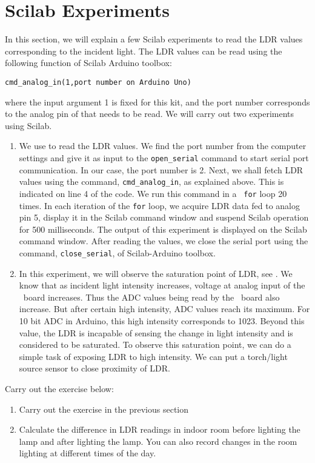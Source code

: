 \section {Scilab Experiments}
In this section, we will explain a few Scilab experiments to read the
LDR values corresponding to the incident light. The LDR values can be
read using the following function of Scilab Arduino toolbox:
\begin{lstlisting}[style=nonumbers]
  cmd_analog_in(1,port number on Arduino Uno)
\end{lstlisting}
where the input argument 1 is fixed for this kit, and the port number corresponds to the analog pin of \arduino that needs to be read.  We will carry out two experiments using Scilab.

\begin{enumerate}
\item We use  to read the LDR values.  We find the
  port number from the computer settings and give it as input to the
  {\tt open\_serial} command to start serial port communication. In
  our case, the port number is 2. Next, we shall fetch LDR values
  using the command, {\tt cmd\_analog\_in}, as explained above. This
  is indicated on line 4 of the code. We run this command in a {\tt
    for} loop 20 times. In each iteration of the {\tt for} loop, we
  acquire LDR data fed to analog pin 5, display it in the Scilab
  command window and suspend Scilab operation for 500
  milliseconds. The output of this experiment is displayed on the Scilab command
  window. After reading the values, we close the serial port using the
  command, {\tt close\_serial}, of Scilab-Arduino toolbox.

\item In this experiment, we will observe the saturation point of LDR,
  see .  We know that as incident light intensity
  increases, voltage at analog input of the \arduino\ board
  increases. Thus the ADC values being read by the \arduino\ board also
  increase. But after certain high intensity, ADC values reach its
  maximum. For 10 bit ADC in Arduino, this high intensity corresponds
  to 1023.  Beyond this value, the LDR is incapable of sensing the
  change in light intensity and is considered to be saturated. To
  observe this saturation point, we can do a simple task of exposing
  LDR to high intensity. We can put a torch/light source sensor to
  close proximity of LDR.
\end{enumerate}

\begin{exercise}
Carry out the exercise below:
\begin{enumerate}
\item Carry out the exercise in the previous section
\item Calculate the difference in LDR readings in indoor room
  before lighting the lamp and after lighting the lamp. You can also
  record changes in the room lighting at different times of the day.
\end{enumerate}
\end{exercise}

